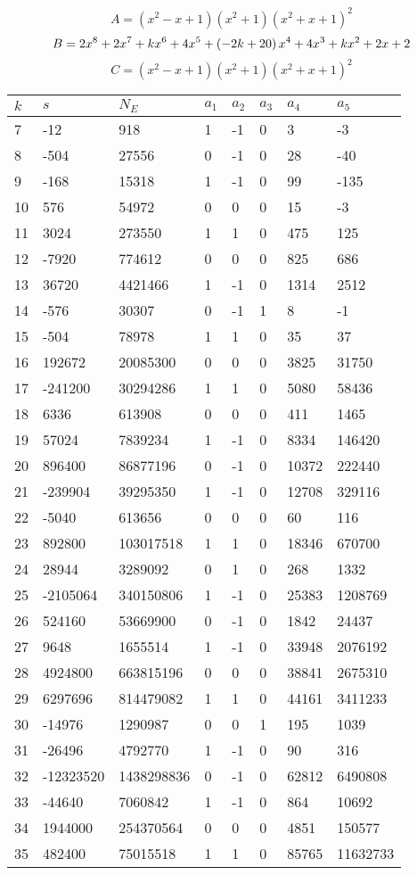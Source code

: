 \documentclass{amsart}
\begin{document}
$$A=(x^2
 - x
 + 1)(x^2
 + 1)(x^2
 + x
 + 1)^{2}$$
$$B=2\*x^8
 + 2\*x^7
 + k\*x^6
 + 4\*x^5
 + \left(-2\*k
 + 20\right) \*x^4
 + 4\*x^3
 + k\*x^2
 + 2\*x
 + 2$$
$$C=(x^2
 - x
 + 1)(x^2
 + 1)(x^2
 + x
 + 1)^{2}$$
\begin{longtable}{|l|l|l|lllll|}
\hline
$k$ & $s$ & $N_E$ & $a_1$ & $a_2$ & $a_3$ & $a_4$ & $a_5$\\
\hline
7&-12&918&1&-1&0&3&-3\\
8&-504&27556&0&-1&0&28&-40\\
9&-168&15318&1&-1&0&99&-135\\
10&576&54972&0&0&0&15&-3\\
11&3024&273550&1&1&0&475&125\\
12&-7920&774612&0&0&0&825&686\\
13&36720&4421466&1&-1&0&1314&2512\\
14&-576&30307&0&-1&1&8&-1\\
15&-504&78978&1&1&0&35&37\\
16&192672&20085300&0&0&0&3825&31750\\
17&-241200&30294286&1&1&0&5080&58436\\
18&6336&613908&0&0&0&411&1465\\
19&57024&7839234&1&-1&0&8334&146420\\
20&896400&86877196&0&-1&0&10372&222440\\
21&-239904&39295350&1&-1&0&12708&329116\\
22&-5040&613656&0&0&0&60&116\\
23&892800&103017518&1&1&0&18346&670700\\
24&28944&3289092&0&1&0&268&1332\\
25&-2105064&340150806&1&-1&0&25383&1208769\\
26&524160&53669900&0&-1&0&1842&24437\\
27&9648&1655514&1&-1&0&33948&2076192\\
28&4924800&663815196&0&0&0&38841&2675310\\
29&6297696&814479082&1&1&0&44161&3411233\\
30&-14976&1290987&0&0&1&195&1039\\
31&-26496&4792770&1&-1&0&90&316\\
32&-12323520&1438298836&0&-1&0&62812&6490808\\
33&-44640&7060842&1&-1&0&864&10692\\
34&1944000&254370564&0&0&0&4851&150577\\
35&482400&75015518&1&1&0&85765&11632733\\

\end{longtable}
\end{document}
